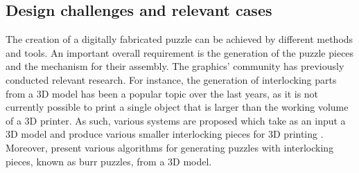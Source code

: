 \documentclass[acmlarge,screen,dvipsnames]{acmart}
\begin{document}
\subsection{Design challenges and relevant cases}
 
%
The creation of a digitally fabricated puzzle can be achieved by
different methods and tools. An important overall requirement is the
generation of the puzzle pieces and the mechanism for their
assembly. The graphics' community has previously conducted relevant
research. For instance, the generation of interlocking parts from a 3D
model has been a popular topic over the last years, as it is not
currently possible to print a single object that is larger than the
working volume of a 3D printer. As such, various systems are proposed
which take as an input a 3D model and produce various smaller
interlocking pieces for 3D printing
\cite{Song:2015:POI:2797416.2797510,luo_chopper:_2012,klein_interlocking_2014,skouras_interactive_2015}. Moreover,
\cite{Xin:2011:MBP:2010324.1964992,Song:2012:RIP:2366145.2366147,sun_computational_2015}
present various algorithms for generating puzzles with interlocking
pieces, known as burr puzzles, from a 3D model.
\end{document}
